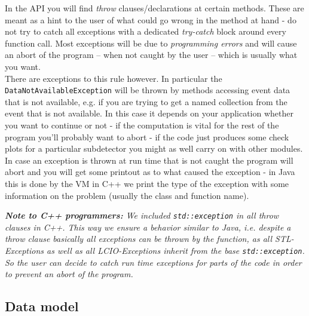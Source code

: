 \documentclass[twoside]{article}
\begin{document}
In the API you will find {\em throw} clauses/declarations at certain methods. These are meant as a hint
to the user of what could go wrong in the method at hand - do not try to catch all exceptions with a 
dedicated {\em try-catch} block around every function call. Most exceptions will be due to 
{\em programming errors} and will cause an abort of the program -- when not caught by the user -- 
which is usually what you want.\\
There are exceptions to this rule however. In particular the \verb$DataNotAvailableException$ will be
thrown by methods accessing event data that is not available, e.g. if you are trying to get a named 
collection from the event that is not available. 
In this case it depends on your application whether you want to continue or not - if the 
computation is vital for the rest of the program you'll probably want to abort - if the code just
produces some check plots for a particular subdetector you might as well carry on with other 
modules.\\
In case an exception is thrown at run time that is not caught the program will abort and you will get 
some printout as to what caused the exception - 
in Java this is done by the VM in C++ we print the type of the exception with some information on the 
problem (usually the class and function name).

\vspace{\baselineskip}
{\it {\bf Note to C++ programmers:} We included \verb$std::exception$ in all {\em throw} clauses in 
C++. This way we ensure a behavior similar to Java, i.e. despite a {\em throw}
clause basically all exceptions can be thrown by the function, as all STL-Exceptions 
as well as all LCIO-Exceptions inherit from the base \verb$std::exception$. So the user can decide to
catch {\em run time} exceptions for parts of the code in order to prevent an abort of the program. 
}

\subsection{Data model \label{sec_datamodel}}
\end{document}
